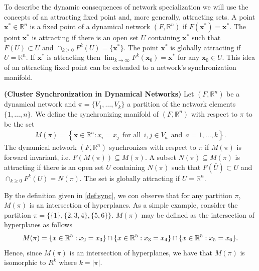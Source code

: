 \documentclass[12pt]{thesis}
\begin{document}
To describe the dynamic consequences of network specialization we will use the concepts of an attracting fixed point and, more generally, attracting sets.
A point $\mathbf{x}^*\in\mathbb{R}^n$ is a {fixed point} of a dynamical network $(F,\mathbb{R}^n)$ if $F(\mathbf{x}^*)=\mathbf{x}^*.$ The point $\mathbf{x}^*$ is {attracting} if there is an open set $U$ containing $\mathbf{x}^*$ such that {$F(U)\subset U$ and $\cap_{k\geq 0}F^k(U)=\{\mathbf{x}^*\}$}.
The point $\mathbf{x}^*$ is {globally attracting} if $U=\mathbb{R}^n$.
If $\mathbf{x}^*$ is attracting then $\lim_{k\rightarrow\infty}F^k(\mathbf{x}_0)=\mathbf{x}^*$ for any $\mathbf{x}_0\in U$.
This idea of an attracting fixed point can be extended to a network's synchronization manifold.

\begin{definition}\textbf{(Cluster Synchronization in Dynamical Networks)}\label{def:sync}
Let $(F,\mathbb{R}^n)$ be a dynamical network and $\pi=\{V_1,\dots,V_k\}$ a partition of the network elements $\{1,\dots,n\}$.
We define the {synchronizing manifold} of $(F,\mathbb{R}^n)$ with respect to $\pi$ to be the set 
\begin{align*}
    M(\pi) = \left\{\mathbf{x}\in\mathbb{R}^n : x_i=x_j \ \ \text{for all} \ \ i,j\in V_a \ \ \text{and} \ \  a=1,\dots,k\right\}.
\end{align*}
The dynamical network $(F,\mathbb{R}^n)$ synchronizes with respect to $\pi$ if $M(\pi)$ is {forward invariant}, i.e. $F(M(\pi))\subseteq M(\pi)$.
A subset $N(\pi)\subseteq M(\pi)$ is {attracting} if there is an open set $U$ containing $N(\pi)$ such that $F(\bar{U})\subset U$ and $\cap_{k\geq 0}F^k(U)=N(\pi)$. The set is {globally attracting} if $U=\mathbb{R}^n$.
\end{definition}


\begin{example}
By the definition given in \ref{def:sync}, we con observe that for any partition $\pi$, $M(\pi)$ is an intersection of hyperplanes.
As a simple example, consider the partition $\pi = \{\{1\},\{2,3,4\},\{5,6\}\}$.
$M(\pi)$ may be defined as the intersection of hyperplanes as follows
\begin{align*}
    M(\pi) = \{x \in \mathbb{R}^5: x_2 = x_3\} \cap \{x\in\mathbb{R}^5 : x_3=x_4\} \cap \{x\in\mathbb{R}^5 : x_5=x_6\}.
\end{align*}
Hence, since $M(\pi)$ is an intersection of hyperplanes, we have that $M(\pi)$ is isomorphic to $R^k$ where $k = |\pi|$.
\end{example}
\end{document}
